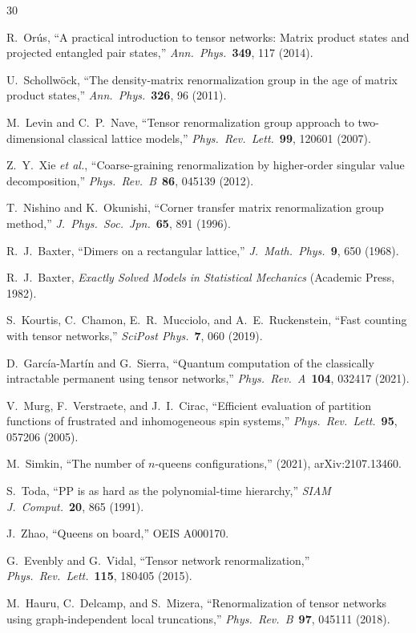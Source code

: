 \documentclass[12pt,a4paper]{ctexart}
\begin{document}
\begin{thebibliography}{30}

 R.~Or\'{u}s, ``A practical introduction to tensor networks: Matrix product states and projected entangled pair states,'' \textit{Ann.~Phys.}~\textbf{349}, 117 (2014).

 U.~Schollw\"{o}ck, ``The density-matrix renormalization group in the age of matrix product states,'' \textit{Ann.~Phys.}~\textbf{326}, 96 (2011).

 M.~Levin and C.~P.~Nave, ``Tensor renormalization group approach to two-dimensional classical lattice models,'' \textit{Phys.~Rev.~Lett.}~\textbf{99}, 120601 (2007).

 Z.~Y.~Xie \textit{et al.}, ``Coarse-graining renormalization by higher-order singular value decomposition,'' \textit{Phys.~Rev.~B}~\textbf{86}, 045139 (2012).

 T.~Nishino and K.~Okunishi, ``Corner transfer matrix renormalization group method,'' \textit{J.~Phys.~Soc.~Jpn.}~\textbf{65}, 891 (1996).

 R.~J.~Baxter, ``Dimers on a rectangular lattice,'' \textit{J.~Math.~Phys.}~\textbf{9}, 650 (1968).

 R.~J.~Baxter, \textit{Exactly Solved Models in Statistical Mechanics} (Academic Press, 1982).

 S.~Kourtis, C.~Chamon, E.~R.~Mucciolo, and A.~E.~Ruckenstein, ``Fast counting with tensor networks,'' \textit{SciPost Phys.}~\textbf{7}, 060 (2019).

 D.~Garc\'{i}a-Mart\'{i}n and G.~Sierra, ``Quantum computation of the classically intractable permanent using tensor networks,'' \textit{Phys.~Rev.~A}~\textbf{104}, 032417 (2021).

 V.~Murg, F.~Verstraete, and J.~I.~Cirac, ``Efficient evaluation of partition functions of frustrated and inhomogeneous spin systems,'' \textit{Phys.~Rev.~Lett.}~\textbf{95}, 057206 (2005).

 M.~Simkin, ``The number of $n$-queens configurations,'' (2021), arXiv:2107.13460.

 S.~Toda, ``PP is as hard as the polynomial-time hierarchy,'' \textit{SIAM J.~Comput.}~\textbf{20}, 865 (1991).

 J.~Zhao, ``Queens on board,'' OEIS A000170.

 G.~Evenbly and G.~Vidal, ``Tensor network renormalization,'' \textit{Phys.~Rev.~Lett.}~\textbf{115}, 180405 (2015).

 M.~Hauru, C.~Delcamp, and S.~Mizera, ``Renormalization of tensor networks using graph-independent local truncations,'' \textit{Phys.~Rev.~B}~\textbf{97}, 045111 (2018).

\end{thebibliography}
\end{document}
